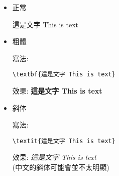 
\begin{itemize}
  \item
  {
    正常

    這是文字 This is text
  } %

  \item
  {
    粗體

    寫法:
    \begin{DescriptionFrame}
    \verb|\textbf{這是文字 This is text}|
    \end{DescriptionFrame}

    效果: \textbf{這是文字 This is text}
  } %

  \item
  {
    斜体

    寫法:
    \begin{DescriptionFrame}
    \verb|\textit{這是文字 This is text}|
    \end{DescriptionFrame}

    效果: \textit{這是文字 This is text}\\
    (中文的斜体可能會並不太明顯)
  } %
\end{itemize}

